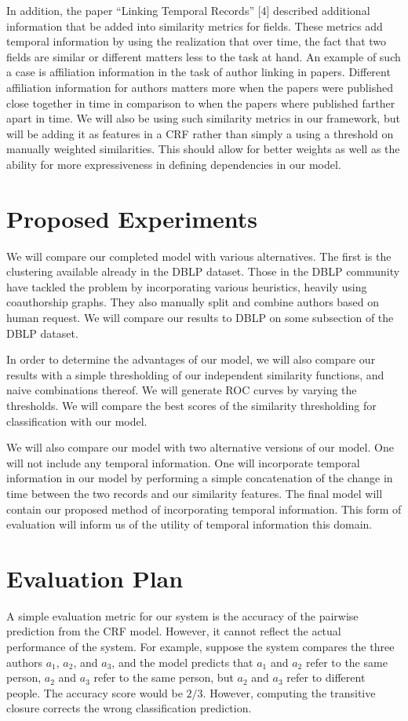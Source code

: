 \documentclass[twocolumn,letterpaper]{article}
\begin{document}
In addition, the paper “Linking Temporal Records” [4] described additional information that be added into similarity metrics for fields. These metrics add temporal information by using the realization that over time, the fact that two fields are similar or different matters less to the task at hand. An example of such a case is affiliation information in the task of author linking in papers. Different affiliation information for authors matters more when the papers were published close together in time in comparison to when the papers where published farther apart in time. We will also be using such similarity metrics in our framework, but will be adding it as features in a CRF rather than simply a using a threshold on manually weighted similarities. This should allow for better weights as well as the ability for more expressiveness in defining dependencies in our model.

\section{Proposed Experiments} %
\label{sec:proposed_experiments}
We will compare our completed model with various alternatives. The first is the clustering available already in the DBLP dataset. Those in the DBLP community have tackled the problem by incorporating various heuristics, heavily using coauthorship graphs. They also manually split and combine authors based on human request. We will compare our results to DBLP on some subsection of the DBLP dataset. 

In order to determine the advantages of our model, we will also compare our results with a simple thresholding of our independent similarity functions, and naive combinations thereof. We will generate ROC curves by varying the thresholds. We will compare the best scores of the similarity thresholding for classification with our model.

We will also compare our model with two alternative versions of our model. One will not include any temporal information. One will incorporate temporal information in our model by performing a simple concatenation of the change in time between the two records and our similarity features. The final model will contain our proposed method of incorporating temporal information. This form of evaluation will inform us of the utility of temporal information this domain.

\section{Evaluation Plan} %
\label{sec:evaluation}
A simple evaluation metric for our system is the accuracy
of the pairwise prediction from the CRF model.  However, it cannot
reflect the actual performance of the system.  For example, suppose
the system compares the three authors $a_1$, $a_2$, and $a_3$, and the
model predicts that $a_1$ and $a_2$ refer to the same person, $a_2$
and $a_3$ refer to the same person, but $a_2$ and $a_3$ refer to
different people.  The accuracy score would be $2/3$.  However,
computing the transitive closure corrects the wrong classification
prediction.
\end{document}
